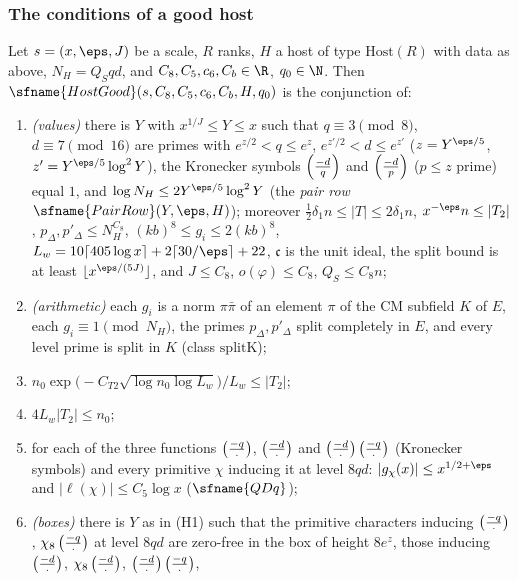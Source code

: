 \subsubsection{The conditions of a good host}

\begin{definition}\label{pf:top-supply:hostgood}
Let $s=(x,\eps,J)$ be a scale, $R$ ranks, $H$ a host of type $\mathrm{Host}(R)$ with data as above,
$N_H=Q_Sqd$, and $C_8,C_5,c_6,C_b\in\R$, $q_0\in\N$. Then $\sfname{HostGood}(s,C_8,C_5,c_6,C_b,H,q_0)$ is the
conjunction of:
\begin{enumerate}[label=(H\arabic*),leftmargin=*]
\item \emph{(values)} there is $Y$ with $x^{1/J}\le Y\le x$ such that $q\equiv3\pmod8$, $d\equiv7\pmod{16}$ are primes
with $e^{z/2}<q\le e^{z}$, $e^{z'/2}<d\le e^{z'}$ ($z=Y^{\eps/5}$, $z'=Y^{\eps/5}\log^2Y$), the Kronecker symbols
$\left(\frac{-d}{q}\right)$ and $\left(\frac{-d}{p}\right)$ ($p\le z$ prime) equal $1$, and $\log N_H\le2Y^{\eps/5}\log^2Y$ (the
\emph{pair row} $\sfname{PairRow}(Y,\eps,H)$); moreover $\frac12\delta_1n\le|T|\le2\delta_1n$, $x^{-\eps}n\le|T_2|$,
$p_\Delta,p'_\Delta\le N_H^{C_8}$, $(kb)^8\le g_i\le2(kb)^8$, $L_w=10\lceil405\log x\rceil+2\lceil30/\eps\rceil+22$,
$\mathfrak c$ is the unit ideal, the split bound is at least $\lfloor x^{\eps/(5J)}\rfloor$, and $J\le C_8$,
$o(\varphi)\le C_8$, $Q_S\le C_8n$;
\item \emph{(arithmetic)} each $g_i$ is a norm $\pi\bar\pi$ of an element $\pi$ of the CM subfield $K$ of $E$, each
$g_i\equiv1\pmod{N_H}$, the primes $p_\Delta,p'_\Delta$ split completely in $E$, and every level prime is split in
$K$ (class $\mathrm{splitK}$);
\item $n_0\exp\big(-C_{T2}\sqrt{\log n_0\log L_w}\big)/L_w\le|T_2|$;
\item $4L_w|T_2|\le n_0$;
\item for each of the three functions $\left(\frac{-q}{\cdot}\right)$, $\left(\frac{-d}{\cdot}\right)$ and
$\left(\frac{-d}{\cdot}\right)\left(\frac{-q}{\cdot}\right)$ (Kronecker symbols) and every primitive $\chi$ inducing it at level
$8qd$: $|g_\chi(x)|\le x^{1/2+\eps}$ and $|\ell(\chi)|\le C_5\log x$ ($\sfname{QDq}$);
\item \emph{(boxes)} there is $Y$ as in (H1) such that the primitive characters inducing $\left(\frac{-q}{\cdot}\right)$,
$\chi_8\left(\frac{-q}{\cdot}\right)$ at level $8qd$ are zero-free in the box of height $8e^{z}$, those inducing
$\left(\frac{-d}{\cdot}\right)$, $\chi_8\left(\frac{-d}{\cdot}\right)$, $\left(\frac{-d}{\cdot}\right)\left(\frac{-q}{\cdot}\right)$,

\end{enumerate}
\end{definition}

